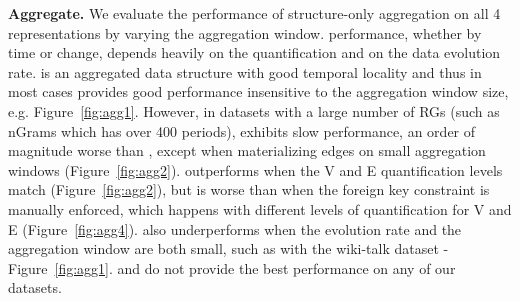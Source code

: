 {\bf Aggregate.}  We evaluate the performance of structure-only
aggregation on all 4 representations by varying the aggregation
window.   performance, whether by time or change,
depends heavily on the quantification and on the data evolution rate.
\og is an aggregated data structure with good temporal locality and
thus in most cases provides good performance insensitive to the
aggregation window size, e.g. Figure~\ref{fig:agg1}.  However, in
datasets with a large number of RGs (such as nGrams which has over 400
periods), \og exhibits slow performance, an order of magnitude worse
than \ve, except when materializing edges on small aggregation windows
(Figure~\ref{fig:agg2}).  \ve outperforms \og when the V and E
quantification levels match (Figure~\ref{fig:agg2}), but is worse than
\og when the foreign key constraint is manually enforced, which
happens with different levels of quantification for V and E
(Figure~\ref{fig:agg4}).  \ve also underperforms \og
when the evolution rate and the aggregation window are both small,
such as with the wiki-talk dataset - Figure~\ref{fig:agg1}.  \sg and
\hg do not provide the best performance on any of our datasets.

